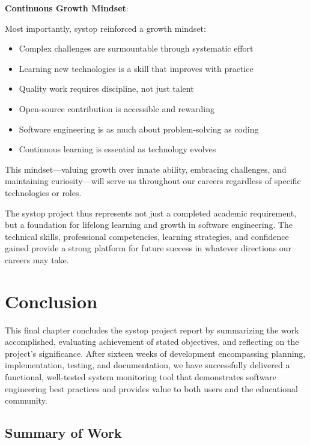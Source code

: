 \documentclass[12pt,a4paper,oneside]{report}
\begin{document}
\textbf{Continuous Growth Mindset}:

Most importantly, systop reinforced a growth mindset:

\begin{itemize}
    \item Complex challenges are surmountable through systematic effort
    \item Learning new technologies is a skill that improves with practice
    \item Quality work requires discipline, not just talent
    \item Open-source contribution is accessible and rewarding
    \item Software engineering is as much about problem-solving as coding
    \item Continuous learning is essential as technology evolves
\end{itemize}

This mindset---valuing growth over innate ability, embracing challenges, and maintaining curiosity---will serve us throughout our careers regardless of specific technologies or roles.

The systop project thus represents not just a completed academic requirement, but a foundation for lifelong learning and growth in software engineering. The technical skills, professional competencies, learning strategies, and confidence gained provide a strong platform for future success in whatever directions our careers may take.

\chapter{Conclusion}
\label{chap:conclusion}

This final chapter concludes the systop project report by summarizing the work accomplished, evaluating achievement of stated objectives, and reflecting on the project's significance. After sixteen weeks of development encompassing planning, implementation, testing, and documentation, we have successfully delivered a functional, well-tested system monitoring tool that demonstrates software engineering best practices and provides value to both users and the educational community.

\section{Summary of Work}
\label{sec:summary}
\end{document}
